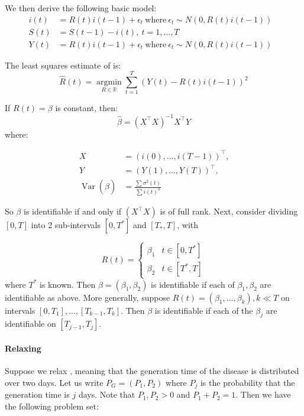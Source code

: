 \documentclass[11pt,a4paper,titlepage]{article}
\theoremstyle{definition}
\begin{document}
We then derive the following basic model:
\begin{align}
    i(t) & = R(t) i(t-1) + \epsilon_t ~ \text{where} ~ \epsilon_t \sim N(0, R(t)i(t-1)) & \nonumber \\
    S(t) & = S(t - 1) - i(t), ~t=1,\ldots,T & \nonumber \\
    Y(t) & = R(t) i(t-1) + \epsilon_t ~ \text{where} ~ \epsilon_t \sim N(0, R(t)i(t-1))  \label{eq:Y-basic} &
\end{align}

The least squares estimate of  is:
\begin{equation}
    \label{eq:r-hat-basic}
    \hat{R}(t) = \mathop{\mathrm{argmin}}\limits_{R \in \mathbb{R}} \sum\limits_{t=1}^{T} {\left( Y(t) - R(t)i(t-1) \right)^2}
\end{equation}

If $R(t) = \beta$ is constant, then:
$$\hat{\beta} = \left(X^{\top} X\right)^{-1}X^{\top} Y$$
where:

\begin{align*}
    X & = (i(0), \ldots, i(T-1))^{\top} \text{,} \\
    Y & = (Y(1), \ldots, Y(T))^{\top} \text{,} \\
    \operatorname{Var}(\hat{\beta}) & = \frac{\sum{\sigma^2(t)}}{\sum{i(t)^2}}
\end{align*}

So $\beta$ is identifiable if and only if $(X^{\top}X)$ is of full rank.
Next, consider dividing $[0,T]$ into 2 sub-intervals $[0, T^{*}]$ and $[T_{*}, T]$, with

$$
    R(t) =
    \begin{cases}
        \beta_1 & t \in [0,T^{*}] \\
        \beta_2 & t \in [T^{*}, T]
    \end{cases}
$$
where $T^{*}$ is known.
Then $\beta = (\beta_1, \beta_2)$ is identifiable if each of $\beta_1, \beta_2$ are identifiable as above.
More generally, suppose $R(t) = (\beta_1, \ldots, \beta_k), k \ll T$ on intervals $[0, T_1], \ldots, [T_{k-1}, T_k]$. Then $\beta$ is identifiable if each of the $\beta_j$ are identifiable on $[T_{j-1}, T_j]$.

\paragraph{Relaxing }

Suppose we relax , meaning that the generation time of the disease is distributed over two days.
Let us write $P_{G} = (P_1, P_2)$ where $P_j$ is the probability that the generation time is $j$ days.
Note that $P_1, P_2 > 0$ and $P_1 + P_2 = 1$.
Then we have the following problem set:
\end{document}
